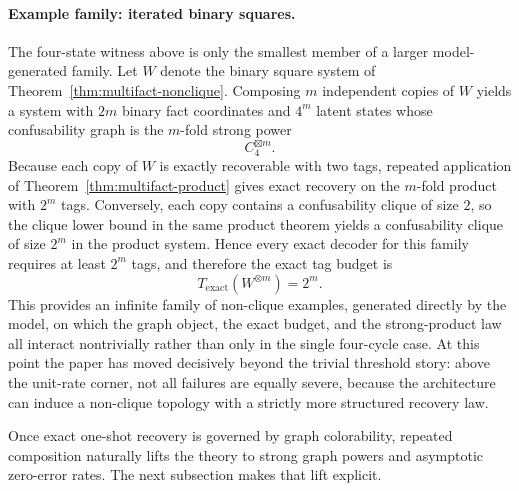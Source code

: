 \paragraph{Example family: iterated binary squares.}
The four-state witness above is only the smallest member of a larger model-generated family. Let $W$ denote the binary square system of Theorem~\ref{thm:multifact-nonclique}. Composing $m$ independent copies of $W$ yields a system with $2m$ binary fact coordinates and $4^m$ latent states whose confusability graph is the $m$-fold strong power
\[
C_4^{\boxtimes m}.
\]
Because each copy of $W$ is exactly recoverable with two tags, repeated application of Theorem~\ref{thm:multifact-product} gives exact recovery on the $m$-fold product with $2^m$ tags. Conversely, each copy contains a confusability clique of size $2$, so the clique lower bound in the same product theorem yields a confusability clique of size $2^m$ in the product system. Hence every exact decoder for this family requires at least $2^m$ tags, and therefore the exact tag budget is
\[
T_{\mathrm{exact}}(W^{\otimes m}) = 2^m.
\]
This provides an infinite family of non-clique examples, generated directly by the model, on which the graph object, the exact budget, and the strong-product law all interact nontrivially rather than only in the single four-cycle case. At this point the paper has moved decisively beyond the trivial threshold story: above the unit-rate corner, not all failures are equally severe, because the architecture can induce a non-clique topology with a strictly more structured recovery law. 

Once exact one-shot recovery is governed by graph colorability, repeated composition naturally lifts the theory to strong graph powers and asymptotic zero-error rates. The next subsection makes that lift explicit.
